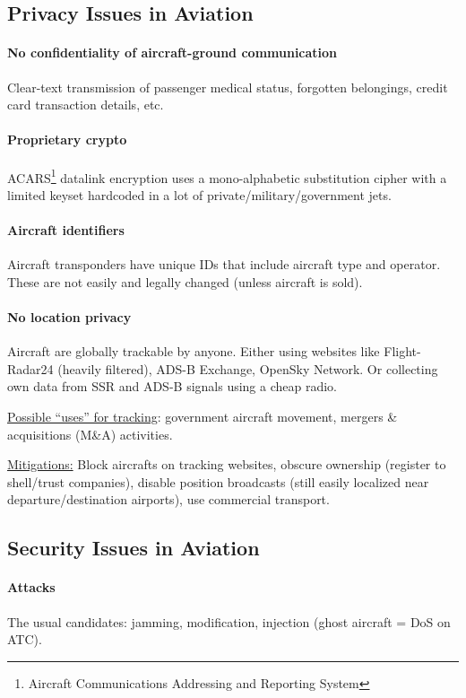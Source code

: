 \subsection{Privacy Issues in Aviation}

\paragraph{No confidentiality of aircraft-ground communication}
Clear-text transmission of passenger medical status, forgotten belongings, credit card transaction details, etc.

\paragraph{Proprietary crypto}
ACARS\footnote{Aircraft Communications Addressing and Reporting System}
datalink encryption uses a mono-alphabetic substitution cipher with a limited keyset hardcoded in a lot of private/military/government jets.

\paragraph{Aircraft identifiers}
Aircraft transponders have unique IDs that include aircraft type and operator.
These are not easily and legally changed (unless aircraft is sold).

\paragraph{No location privacy}
Aircraft are globally trackable by anyone.
Either using websites like Flight-Radar24 (heavily filtered), ADS-B Exchange, OpenSky Network.
Or collecting own data from SSR and ADS-B signals using a cheap radio.

\underline{Possible ``uses'' for tracking}:
government aircraft movement, mergers \& acquisitions (M\&A) activities.

\underline{Mitigations:}
Block aircrafts on tracking websites, obscure ownership (register to shell/trust companies), disable position broadcasts (still easily localized near departure/destination airports), use commercial transport.

\subsection{Security Issues in Aviation}

\paragraph{Attacks}
The usual candidates: jamming, modification, injection (ghost aircraft = DoS on ATC).

